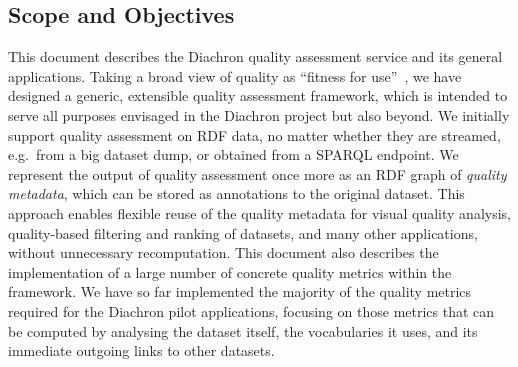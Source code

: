 
\subsection{Scope and Objectives}
\label{sec:ScopeAndObjectives} 

This document describes the Diachron quality assessment service and its general applications.
Taking a broad view of quality as ``fitness for use''~\cite{Juran1974:biblatex}, we have designed a generic, extensible quality assessment framework, which is intended to serve all purposes envisaged in the Diachron project but also beyond.
We initially support quality assessment on RDF data, no matter whether they are streamed, e.g.\ from a big dataset dump, or obtained from a SPARQL endpoint.
We represent the output of quality assessment once more as an RDF graph of \emph{quality metadata}, which can be stored as annotations to the original dataset.
This approach enables flexible reuse of the quality metadata for visual quality analysis, quality-based filtering and ranking of datasets, and many other applications, without unnecessary recomputation.
This document also describes the implementation of a large number of concrete quality metrics within the framework.
We have so far implemented the majority of the quality metrics required for the Diachron pilot applications, focusing on those metrics that can be computed by analysing the dataset itself, the vocabularies it uses, and its immediate outgoing links to other datasets.
